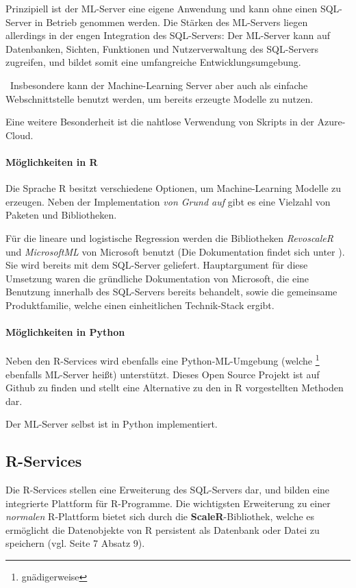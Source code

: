 Prinzipiell ist der ML-Server eine eigene Anwendung und kann ohne einen SQL-Server in Betrieb genommen werden. Die Stärken des ML-Servers liegen allerdings in der engen Integration des SQL-Servers: Der ML-Server kann auf Datenbanken, Sichten, Funktionen und Nutzerverwaltung des SQL-Servers zugreifen, und bildet somit eine umfangreiche Entwicklungsumgebung.

~\newline Insbesondere kann der Machine-Learning Server aber auch als einfache Webschnittstelle benutzt werden, um bereits erzeugte Modelle zu nutzen.

Eine weitere Besonderheit ist die nahtlose Verwendung von Skripts in der Azure-Cloud. 
\paragraph{Möglichkeiten in  R}
Die Sprache R besitzt verschiedene Optionen, um Machine-Learning Modelle zu erzeugen. Neben der Implementation \textit{von Grund auf} gibt es eine Vielzahl von Paketen und Bibliotheken. 

Für die lineare und logistische Regression werden die Bibliotheken \textit{RevoscaleR} und \textit{MicrosoftML} von Microsoft benutzt (Die Dokumentation findet sich unter \cite{RevoscaleR}). Sie wird bereits mit dem SQL-Server geliefert. Hauptargument für diese Umsetzung waren die gründliche Dokumentation von Microsoft, die eine Benutzung innerhalb des SQL-Servers bereits behandelt, sowie die gemeinsame Produktfamilie, welche einen einheitlichen Technik-Stack ergibt. 
\paragraph{Möglichkeiten in Python}
Neben den R-Services wird ebenfalls eine Python-ML-Umgebung (welche \footnote{gnädigerweise} ebenfalls ML-Server heißt) unterstützt. Dieses Open Source Projekt ist auf Github \cite{GithubMLServer} zu finden und stellt eine Alternative zu den in R vorgestellten Methoden dar. 

Der ML-Server selbst ist in Python implementiert.

\subsection{R-Services}
Die R-Services stellen eine Erweiterung des SQL-Servers dar, und bilden eine integrierte Plattform für R-Programme. Die wichtigsten Erweiterung zu einer \textit{normalen} R-Plattform bietet sich durch die \textbf{ScaleR}-Bibliothek, welche es ermöglicht die Datenobjekte von R persistent als Datenbank oder Datei zu speichern (vgl. \cite{SQLData} Seite 7 Absatz 9). 

